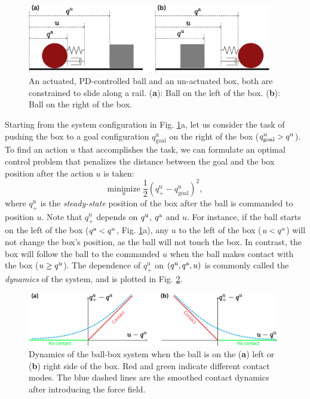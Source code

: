 \begin{figure}[t]
\centering\includegraphics[width = 0.95\textwidth]{figures/01_intro/1d_box_ball.png}
\caption{An actuated, PD-controlled ball and an un-actuated box, both are constrained to slide along a rail. (\textbf{a}): Ball on the left of the box. (\textbf{b}): Ball on the right of the box.}
\label{fig:intro:1d_box_ball}
\end{figure}

Starting from the system configuration in Fig. \ref{fig:intro:1d_box_ball}a,
let us consider the task of pushing the box to a goal configuration $q^\mathrm{u}_\text{goal}$ on the right of the box ($q^\mathrm{u}_\text{goal} > {q^\mathrm{u}}$). To find an action $u$ that accomplishes the task, we can formulate an optimal control problem that penalizes the distance between the goal and the box position after the action $u$ is taken: %
\begin{equation}
\label{eq:intro:simple_task_objective}
\underset{u}{\mathrm{minimize}} \; \frac{1}{2}(q^\mathrm{u}_+ - q^\mathrm{u}_\text{goal})^2, %
\end{equation}
where $q^\mathrm{u}_+$ is the \emph{steady-state} position of the box after the ball is commanded to position $u$. Note that $q_+^\mathrm{u}$ depends on ${q^\mathrm{u}}$, ${q^\mathrm{a}}$ and $u$. For instance, if the ball starts on the left of the box (${q^\mathrm{a}} < {q^\mathrm{u}}$, Fig. \ref{fig:intro:1d_box_ball}a), any $u$ to the left of the box ($u < {q^\mathrm{u}}$) will not change the box's position, as the ball will not touch the box. In contrast, the box will follow the ball to the commanded $u$ when the ball makes contact with the box ($u \geq {q^\mathrm{u}}$). 
The dependence of $q^\mathrm{u}_+$ on $({q^\mathrm{u}}, {q^\mathrm{a}}, u)$ is commonly called the \emph{dynamics} of the system, and is plotted in Fig. \ref{fig:intro:1d_box_ball_dynamics}. 

\begin{figure}[t]
\centering\includegraphics[width = 0.98\textwidth]{figures/01_intro/1d_box_ball_dynamics.png}
\caption{Dynamics of the ball-box system when the ball is on the (\textbf{a}) left or (\textbf{b}) right side of the box. Red and green indicate different contact modes. The blue dashed lines are the smoothed contact dynamics after introducing the force field.}
\label{fig:intro:1d_box_ball_dynamics}
\end{figure}

